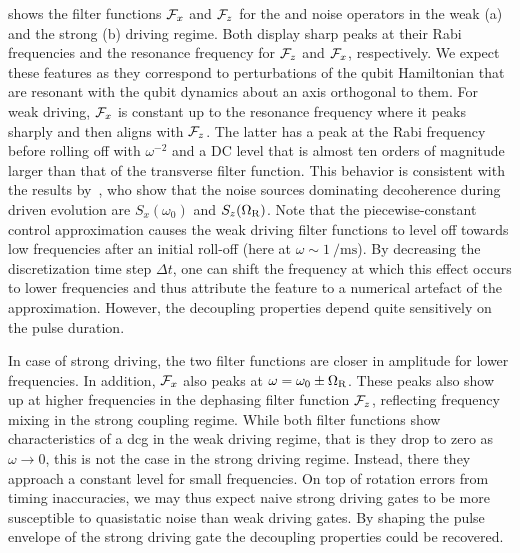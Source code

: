  shows the filter functions $\mathcal{F}_{x}$ and $\mathcal{F}_{z}$ for the \sx and \sz noise operators in the weak (a) and the strong (b) driving regime.
Both display sharp peaks at their Rabi frequencies and the resonance frequency for $\mathcal{F}_{z}$ and $\mathcal{F}_{x}$, respectively.
We expect these features as they correspond to perturbations of the qubit Hamiltonian that are resonant with the qubit dynamics about an axis orthogonal to them.
For weak driving, $\mathcal{F}_{x}$ is constant up to the resonance frequency where it peaks sharply and then aligns with $\mathcal{F}_{z}$.
The latter has a peak at the Rabi frequency before rolling off with $\omega^{-2}$ and a DC level that is almost ten orders of magnitude larger than that of the transverse filter function.
This behavior is consistent with the results by~\citet{Yan2013}, who show that the noise sources dominating decoherence during driven evolution are $S_{x}(\omega_0)$ and $S_{z}(\Omega_{\mathrm{R}})$.
Note that the piecewise-constant control approximation causes the weak driving filter functions to level off towards low frequencies after an initial roll-off (here at $\omega\sim\qty{1}{\per\milli\second}$).
By decreasing the discretization time step $\Delta t$, one can shift the frequency at which this effect occurs to lower frequencies and thus attribute the feature to a numerical artefact of the approximation.
However, the decoupling properties depend quite sensitively on the pulse duration.

In case of strong driving, the two filter functions are closer in amplitude for lower frequencies.
In addition, $\mathcal{F}_{x}$ also peaks at $\omega = \omega_0\pm\Omega_{\mathrm{R}}$.
These peaks also show up at higher frequencies in the dephasing filter function $\mathcal{F}_{z}$, reflecting frequency mixing in the strong coupling regime.
While both filter functions show characteristics of a \gls{dcg} in the weak driving regime, that is they drop to zero as $\omega\rightarrow 0$, this is not the case in the strong driving regime.
Instead, there they approach a constant level for small frequencies.
On top of rotation errors from timing inaccuracies, we may thus expect naive strong driving gates to be more susceptible to quasistatic noise than weak driving gates.
By shaping the pulse envelope of the strong driving gate the decoupling properties could be recovered.

